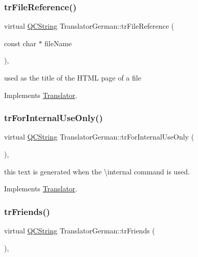 \subsubsection{\texorpdfstring{trFileReference()}{trFileReference()}}
{\footnotesize\ttfamily virtual \mbox{\hyperlink{class_q_c_string}{Q\+C\+String}} Translator\+German\+::tr\+File\+Reference (\begin{DoxyParamCaption}\item[{const char $\ast$}]{file\+Name }\end{DoxyParamCaption})\hspace{0.3cm}{\ttfamily [inline]}, {\ttfamily [virtual]}}

used as the title of the H\+T\+ML page of a file 

Implements \mbox{\hyperlink{class_translator}{Translator}}.

\mbox{\label{class_translator_german_a24cf18c1fc631699b188b1154d48d7dd}} 
\subsubsection{\texorpdfstring{trForInternalUseOnly()}{trForInternalUseOnly()}}
{\footnotesize\ttfamily virtual \mbox{\hyperlink{class_q_c_string}{Q\+C\+String}} Translator\+German\+::tr\+For\+Internal\+Use\+Only (\begin{DoxyParamCaption}{ }\end{DoxyParamCaption})\hspace{0.3cm}{\ttfamily [inline]}, {\ttfamily [virtual]}}

this text is generated when the \textbackslash{}internal command is used. 

Implements \mbox{\hyperlink{class_translator}{Translator}}.

\mbox{\label{class_translator_german_a4056782a390d188b799965586993a57b}} 
\subsubsection{\texorpdfstring{trFriends()}{trFriends()}}
{\footnotesize\ttfamily virtual \mbox{\hyperlink{class_q_c_string}{Q\+C\+String}} Translator\+German\+::tr\+Friends (\begin{DoxyParamCaption}{ }\end{DoxyParamCaption})\hspace{0.3cm}{\ttfamily [inline]}, {\ttfamily [virtual]}}

